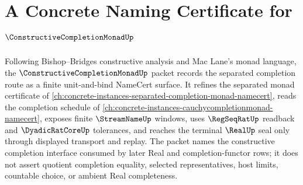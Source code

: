 \chapter{A Concrete Naming Certificate for $\ConstructiveCompletionMonadUp$}
\label{ch:concrete-instances-constructive-completion-monad-namecert}

Following Bishop--Bridges constructive analysis and Mac Lane's monad language, the $\ConstructiveCompletionMonadUp$ packet records the separated completion route as a finite unit-and-bind NameCert surface. It refines the separated monad certificate of \autoref{ch:concrete-instances-separated-completion-monad-namecert}, reads the completion schedule of \autoref{ch:concrete-instances-cauchycompletionmonad-namecert}, exposes finite $\StreamNameUp$ windows, uses $\RegSeqRatUp$ readback and $\DyadicRatCoreUp$ tolerances, and reaches the terminal $\RealUp$ seal only through displayed transport and replay. The packet names the constructive completion interface consumed by later Real and completion-functor rows; it does not assert quotient completion equality, selected representatives, host limits, countable choice, or ambient Real completeness.

